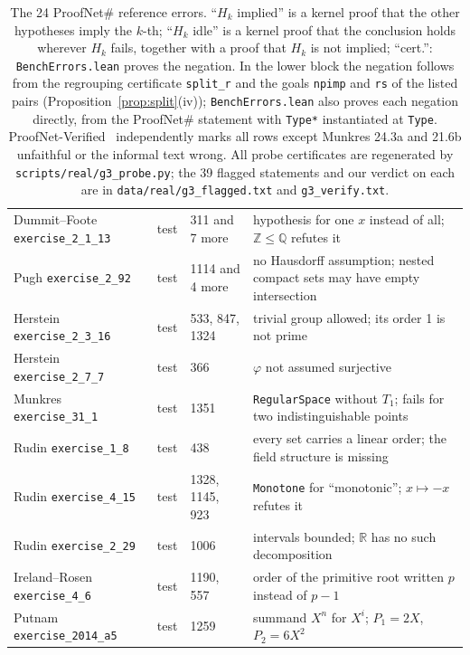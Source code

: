 \documentclass[10pt]{article}
\theoremstyle{definition}
\begin{document}
\begin{table}[h]
\begin{tabular}{lllp{6.2cm}}
Dummit--Foote \texttt{exercise\_2\_1\_13} & test & 311 and 7 more & hypothesis for one $x$ instead of all; $\mathbb Z\le\mathbb Q$ refutes it\\
Pugh \texttt{exercise\_2\_92} & test & 1114 and 4 more & no Hausdorff assumption; nested compact sets may have empty intersection\\
Herstein \texttt{exercise\_2\_3\_16} & test & 533, 847, 1324 & trivial group allowed; its order 1 is not prime\\
Herstein \texttt{exercise\_2\_7\_7} & test & 366 & $\varphi$ not assumed surjective\\
Munkres \texttt{exercise\_31\_1} & test & 1351 & \texttt{RegularSpace} without $T_1$; fails for two indistinguishable points\\
Rudin \texttt{exercise\_1\_8} & test & 438 & every set carries a linear order; the field structure is missing\\
Rudin \texttt{exercise\_4\_15} & test & 1328, 1145, 923 & \texttt{Monotone} for ``monotonic''; $x\mapsto -x$ refutes it\\
Rudin \texttt{exercise\_2\_29} & test & 1006 & intervals bounded; $\mathbb R$ has no such decomposition\\
Ireland--Rosen \texttt{exercise\_4\_6} & test & 1190, 557 & order of the primitive root written $p$ instead of $p-1$\\
Putnam \texttt{exercise\_2014\_a5} & test & 1259 & summand $X^n$ for $X^i$; $P_1=2X$, $P_2=6X^2$\\
\bottomrule
\end{tabular}
\caption{The 24 ProofNet\# reference errors. ``$H_k$ implied'' is a kernel proof that the other
hypotheses imply the $k$-th; ``$H_k$ idle'' is a kernel proof that the conclusion holds wherever
$H_k$ fails, together with a proof that $H_k$ is not implied; ``cert.'': \texttt{BenchErrors.lean}
proves the negation. In the lower block the negation follows from the regrouping certificate
\texttt{split\_r} and the goals \texttt{npimp} and \texttt{rs} of the listed pairs
(Proposition~\ref{prop:split}(iv)); \texttt{BenchErrors.lean} also proves each negation directly,
from the ProofNet\# statement with \texttt{Type*} instantiated at \texttt{Type}. ProofNet-Verified~\cite{pnv} independently marks all rows
except Munkres 24.3a and 21.6b unfaithful or the informal text wrong. All probe certificates are regenerated by
\texttt{scripts/real/g3\_probe.py}; the 39 flagged statements and our verdict on each are in
\texttt{data/real/g3\_flagged.txt} and \texttt{g3\_verify.txt}.}
\label{tab:refs}
\end{table}
\end{document}
